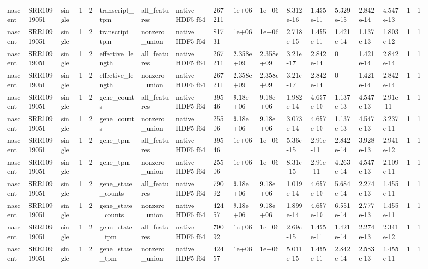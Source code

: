 \begin{tabular}{llllllllllllllllll}
nascent & SRR10919051 & single & 1 & 2 & transcript\_tpm & all\_features & native HDF5 f64 & 267211 & 1e+06 & 1e+06 & 8.312e-16 & 1.455e-11 & 5.329e-15 & 2.842e-14 & 4.547e-13 & 1 & 1 \\
nascent & SRR10919051 & single & 1 & 2 & transcript\_tpm & nonzero\_union & native HDF5 f64 & 81731 & 1e+06 & 1e+06 & 2.718e-15 & 1.455e-11 & 1.421e-14 & 1.137e-13 & 1.803e-12 & 1 & 1 \\
nascent & SRR10919051 & single & 1 & 2 & effective\_length & all\_features & native HDF5 f64 & 267211 & 2.358e+09 & 2.358e+09 & 3.21e-17 & 2.842e-14 & 0 & 1.421e-14 & 2.842e-14 & 1 & 1 \\
nascent & SRR10919051 & single & 1 & 2 & effective\_length & nonzero\_union & native HDF5 f64 & 267211 & 2.358e+09 & 2.358e+09 & 3.21e-17 & 2.842e-14 & 0 & 1.421e-14 & 2.842e-14 & 1 & 1 \\
nascent & SRR10919051 & single & 1 & 2 & gene\_counts & all\_features & native HDF5 f64 & 39546 & 9.18e+06 & 9.18e+06 & 1.982e-14 & 4.657e-10 & 1.137e-13 & 4.547e-13 & 2.91e-11 & 1 & 1 \\
nascent & SRR10919051 & single & 1 & 2 & gene\_counts & nonzero\_union & native HDF5 f64 & 25506 & 9.18e+06 & 9.18e+06 & 3.073e-14 & 4.657e-10 & 1.137e-13 & 4.547e-13 & 3.237e-11 & 1 & 1 \\
nascent & SRR10919051 & single & 1 & 2 & gene\_tpm & all\_features & native HDF5 f64 & 39546 & 1e+06 & 1e+06 & 5.36e-15 & 2.91e-11 & 2.842e-14 & 3.928e-13 & 2.941e-12 & 1 & 1 \\
nascent & SRR10919051 & single & 1 & 2 & gene\_tpm & nonzero\_union & native HDF5 f64 & 25506 & 1e+06 & 1e+06 & 8.31e-15 & 2.91e-11 & 4.263e-14 & 4.547e-13 & 2.109e-11 & 1 & 1 \\
nascent & SRR10919051 & single & 1 & 2 & gene\_state\_counts & all\_features & native HDF5 f64 & 79092 & 9.18e+06 & 9.18e+06 & 1.019e-14 & 4.657e-10 & 5.684e-14 & 2.274e-13 & 1.455e-11 & 1 & 1 \\
nascent & SRR10919051 & single & 1 & 2 & gene\_state\_counts & nonzero\_union & native HDF5 f64 & 42457 & 9.18e+06 & 9.18e+06 & 1.899e-14 & 4.657e-10 & 6.551e-14 & 2.777e-13 & 1.455e-11 & 1 & 1 \\
nascent & SRR10919051 & single & 1 & 2 & gene\_state\_tpm & all\_features & native HDF5 f64 & 79092 & 1e+06 & 1e+06 & 2.69e-15 & 1.455e-11 & 1.421e-14 & 2.274e-13 & 2.341e-12 & 1 & 1 \\
nascent & SRR10919051 & single & 1 & 2 & gene\_state\_tpm & nonzero\_union & native HDF5 f64 & 42457 & 1e+06 & 1e+06 & 5.011e-15 & 1.455e-11 & 2.842e-14 & 2.583e-13 & 1.455e-11 & 1 & 1 \\

\end{tabular}
